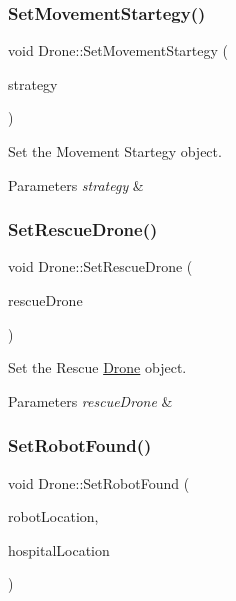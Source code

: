 \subsubsection{\texorpdfstring{Set\+Movement\+Startegy()}{SetMovementStartegy()}}
{\footnotesize\ttfamily void Drone\+::\+Set\+Movement\+Startegy (\begin{DoxyParamCaption}\item[{\hyperlink{classiMovementStrategy}{i\+Movement\+Strategy} $\ast$}]{strategy }\end{DoxyParamCaption})\hspace{0.3cm}{\ttfamily [inline]}}



Set the Movement Startegy object. 


\begin{DoxyParams}{Parameters}
{\em strategy} & \\
\hline
\end{DoxyParams}
\mbox{\label{classDrone_ac9aa5a105012c7ba8be6542217e58242}} 
\subsubsection{\texorpdfstring{Set\+Rescue\+Drone()}{SetRescueDrone()}}
{\footnotesize\ttfamily void Drone\+::\+Set\+Rescue\+Drone (\begin{DoxyParamCaption}\item[{\hyperlink{classDrone}{Drone} $\ast$}]{rescue\+Drone }\end{DoxyParamCaption})\hspace{0.3cm}{\ttfamily [inline]}}



Set the Rescue \hyperlink{classDrone}{Drone} object. 


\begin{DoxyParams}{Parameters}
{\em rescue\+Drone} & \\
\hline
\end{DoxyParams}
\mbox{\label{classDrone_a0e369b1d4bbc379387c8ea6a73d74525}} 
\subsubsection{\texorpdfstring{Set\+Robot\+Found()}{SetRobotFound()}}
{\footnotesize\ttfamily void Drone\+::\+Set\+Robot\+Found (\begin{DoxyParamCaption}\item[{\hyperlink{classVector3}{Vector3}}]{robot\+Location,  }\item[{\hyperlink{classVector3}{Vector3}}]{hospital\+Location }\end{DoxyParamCaption})}



